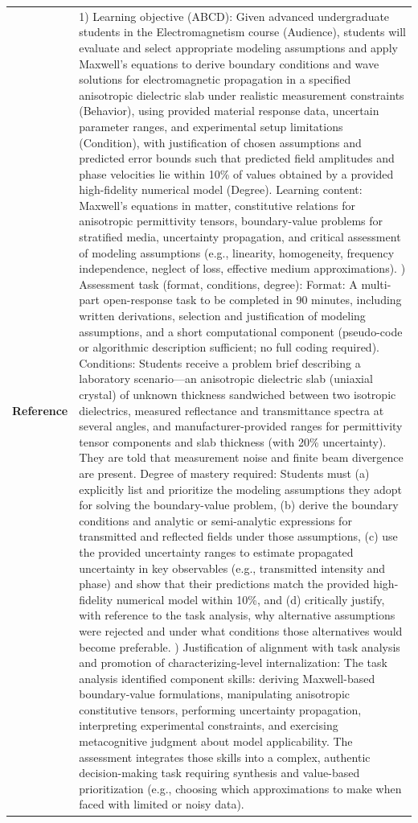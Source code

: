 \begin{longtable}{@{}l p{12.5cm}@{}}
  \textbf{Reference} & 1) Learning objective (ABCD): Given advanced undergraduate students in the Electromagnetism course (Audience), students will evaluate and select appropriate modeling assumptions and apply Maxwell's equations to derive boundary conditions and wave solutions for electromagnetic propagation in a specified anisotropic dielectric slab under realistic measurement constraints (Behavior), using provided material response data, uncertain parameter ranges, and experimental setup limitations (Condition), with justification of chosen assumptions and predicted error bounds such that predicted field amplitudes and phase velocities lie within 10\% of values obtained by a provided high-fidelity numerical model (Degree). Learning content: Maxwell's equations in matter, constitutive relations for anisotropic permittivity tensors, boundary-value problems for stratified media, uncertainty propagation, and critical assessment of modeling assumptions (e.g., linearity, homogeneity, frequency independence, neglect of loss, effective medium approximations). \newline 2) Assessment task (format, conditions, degree): Format: A multi-part open-response task to be completed in 90 minutes, including written derivations, selection and justification of modeling assumptions, and a short computational component (pseudo-code or algorithmic description sufficient; no full coding required). Conditions: Students receive a problem brief describing a laboratory scenario---an anisotropic dielectric slab (uniaxial crystal) of unknown thickness sandwiched between two isotropic dielectrics, measured reflectance and transmittance spectra at several angles, and manufacturer-provided ranges for permittivity tensor components and slab thickness (with 20\% uncertainty). They are told that measurement noise and finite beam divergence are present. Degree of mastery required: Students must (a) explicitly list and prioritize the modeling assumptions they adopt for solving the boundary-value problem, (b) derive the boundary conditions and analytic or semi-analytic expressions for transmitted and reflected fields under those assumptions, (c) use the provided uncertainty ranges to estimate propagated uncertainty in key observables (e.g., transmitted intensity and phase) and show that their predictions match the provided high-fidelity numerical model within 10\%, and (d) critically justify, with reference to the task analysis, why alternative assumptions were rejected and under what conditions those alternatives would become preferable. \newline 3) Justification of alignment with task analysis and promotion of characterizing-level internalization: The task analysis identified component skills: deriving Maxwell-based boundary-value formulations, manipulating anisotropic constitutive tensors, performing uncertainty propagation, interpreting experimental constraints, and exercising metacognitive judgment about model applicability. The assessment integrates those skills into a complex, authentic decision-making task requiring synthesis and value-based prioritization (e.g., choosing which approximations to make when faced with limited or noisy data). 
\end{longtable}
